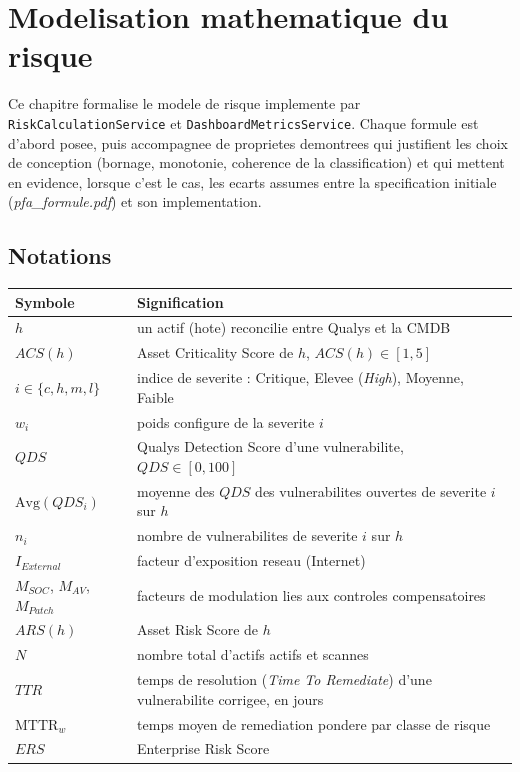 \chapter{Modelisation mathematique du risque}
\label{chap:modelisation}

Ce chapitre formalise le modele de risque implemente par
\texttt{RiskCalculationService} et \texttt{DashboardMetricsService}. Chaque formule
est d'abord posee, puis accompagnee de proprietes demontrees qui justifient les
choix de conception (bornage, monotonie, coherence de la classification) et qui
mettent en evidence, lorsque c'est le cas, les ecarts assumes entre la specification
initiale (\emph{pfa\_formule.pdf}) et son implementation.

\section{Notations}

\begin{longtable}{@{}p{2.6cm}p{10.2cm}@{}}
\toprule
\textbf{Symbole} & \textbf{Signification} \\
\midrule
\endhead
$h$ & un actif (hote) reconcilie entre Qualys et la CMDB \\
$ACS(h)$ & Asset Criticality Score de $h$, $ACS(h)\in[1,5]$ \\
$i \in \{c,h,m,l\}$ & indice de severite : Critique, Elevee (\emph{High}), Moyenne,
Faible \\
$w_i$ & poids configure de la severite $i$ \\
$QDS$ & Qualys Detection Score d'une vulnerabilite, $QDS\in[0,100]$ \\
$\mathrm{Avg}(QDS_i)$ & moyenne des $QDS$ des vulnerabilites ouvertes de severite $i$
sur $h$ \\
$n_i$ & nombre de vulnerabilites de severite $i$ sur $h$ \\
$I_{External}$ & facteur d'exposition reseau (Internet) \\
$M_{SOC}$, $M_{AV}$, $M_{Patch}$ & facteurs de modulation lies aux controles
compensatoires \\
$ARS(h)$ & Asset Risk Score de $h$ \\
$N$ & nombre total d'actifs actifs et scannes \\
$TTR$ & temps de resolution (\emph{Time To Remediate}) d'une vulnerabilite corrigee,
en jours \\
$\mathrm{MTTR}_w$ & temps moyen de remediation pondere par classe de risque \\
$ERS$ & Enterprise Risk Score \\
\bottomrule
\end{longtable}

